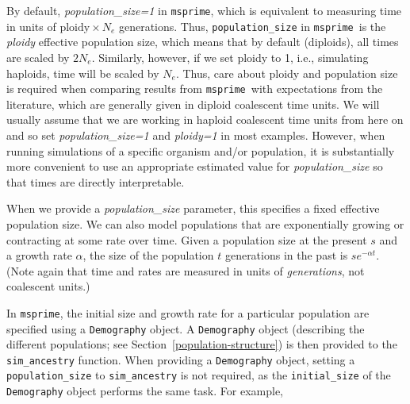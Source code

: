 \documentclass[graybox]{svmult}
\newcommand{\msprime}[0]{\texttt{msprime}}
\begin{document}
By default, \emph{population\_size=1} in \msprime, which is equivalent to measuring
time in units of $\mbox{ploidy}\times N_e$ generations. Thus,
\texttt{population\_size} in \msprime\ is the \emph{ploidy} effective population size,
which means that by default (diploids), all times are scaled by \(2N_e\).
Similarly, however, if we set ploidy to 1, i.e., simulating haploids, time will be scaled by $N_e$.
Thus, care about ploidy
and population size is required when comparing results from \msprime\ with expectations from the literature, which
are generally given in diploid coalescent time units.
We will usually assume that we are working in haploid
coalescent time units from here on and so set \emph{population\_size=1} and \emph{ploidy=1} in most
examples. However, when running simulations of a specific organism and/or population, it
is substantially more convenient to use an appropriate estimated value
for \emph{population\_size} so that times are directly interpretable.

\label{exponentially-growingshrinking-populations}
When we provide a \emph{population\_size} parameter, this specifies a fixed effective
population size. We can also model populations that are exponentially
growing or contracting at some rate over time. Given a population size
at the present \(s\) and a growth rate \(\alpha\), the size of the
population \(t\) generations in the past is $s e^{-\alpha t}$. (Note
again that time and rates are measured in units of \emph{generations},
not coalescent units.)

In \msprime, the initial size and growth rate for a particular population
are specified using a \texttt{Demography} object. A \texttt{Demography} object
(describing the different populations; see Section~\ref{population-structure})
is then provided to the \texttt{sim\_ancestry} function. When providing a
\texttt{Demography} object, setting a \texttt{population\_size} to
\texttt{sim\_ancestry} is not required, as the \texttt{initial\_size} of the
\texttt{Demography} object performs the same task. For example,
\end{document}
